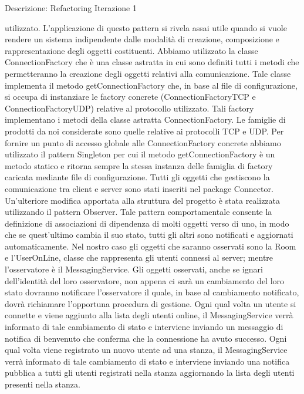 \begin{frame}[allowframebreaks] {Descrizione: Refactoring Iterazione 1}
\begin{scriptsize}
   utilizzato. L'applicazione di questo pattern si rivela assai utile quando si vuole rendere un sistema indipendente dalle modalità di creazione, composizione e 
   rappresentazione degli oggetti costituenti.
   \newline
   Abbiamo utilizzato la classe ConnectionFactory che è una classe astratta in cui sono definiti tutti i metodi che permetteranno la creazione degli oggetti relativi 
   alla comunicazione. Tale classe implementa il metodo getConnectionFactory che, in base al file di configurazione, si occupa di instanziare le factory concrete    
   (ConnectionFactoryTCP e ConnectionFactoryUDP) relative al protocollo utilizzato. Tali factory implementano i metodi della classe astratta ConnectionFactory. Le 
   famiglie di prodotti da noi considerate sono quelle relative ai protocolli TCP e UDP.
   \newline
   Per  fornire un punto di accesso globale alle ConnectionFactory concrete abbiamo utilizzato il pattern Singleton per cui il metodo getConnectionFactory è un 
   metodo statico e ritorna sempre la stessa instanza delle famiglia di factory caricata mediante file di configurazione. 
   \newline
   Tutti gli oggetti che gestiscono la comunicazione tra client e server sono stati inseriti nel package Connector.
   \newline
   Un'ulteriore modifica apportata alla struttura del progetto è stata realizzata utilizzando il pattern Observer. Tale pattern comportamentale consente la    
   definizione di associazioni di dipendenza di molti oggetti verso di uno, in modo che se quest'ultimo cambia il suo stato, tutti gli altri sono notificati e 
   aggiornati automaticamente. Nel nostro caso gli oggetti che saranno osservati sono la Room e l'UserOnLine, classe che rappresenta gli utenti connessi al server; 
   mentre l'osservatore è il MessagingService.
   \newline
   Gli oggetti osservati, anche se ignari dell'identità del loro osservatore, non appena ci sarà un cambiamento del loro stato dovranno notificare l'osservatore il 
   quale, in base al cambiamento notificato, dovrà richiamare l'opportuna procedura di gestione.
   \newline
   Ogni qual volta un utente si connette e viene aggiunto alla lista degli utenti online, il MessagingService verrà informato di tale cambiamento di stato e 
   interviene inviando un messaggio di notifica di benvenuto che conferma che la connessione ha avuto successo.
   \newline
   Ogni qual volta viene registrato un nuovo utente ad una stanza, il MessagingService verrà informato di tale cambiamento di stato e interviene inviando una 
   notifica pubblica a tutti gli utenti registrati nella stanza aggiornando la lista degli utenti presenti nella stanza.
 \end{scriptsize}
\end{frame}

